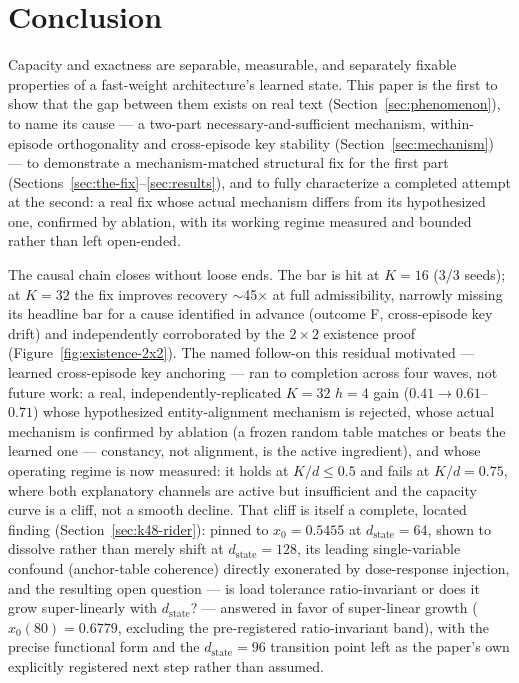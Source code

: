 \section{Conclusion}
\label{sec:conclusion}

Capacity and exactness are separable, measurable, and separately fixable
properties of a fast-weight architecture's learned state. This paper is
the first to show that the gap between them exists on real text
(Section~\ref{sec:phenomenon}), to name its cause --- a two-part
necessary-and-sufficient mechanism, within-episode orthogonality and
cross-episode key stability (Section~\ref{sec:mechanism}) --- to
demonstrate a mechanism-matched structural fix for the first part
(Sections~\ref{sec:the-fix}--\ref{sec:results}), and to fully
characterize a completed attempt at the second: a real fix whose actual
mechanism differs from its hypothesized one, confirmed by ablation, with
its working regime measured and bounded rather than left open-ended.

The causal chain closes without loose ends. The bar is hit at $K{=}16$
(3/3 seeds); at $K{=}32$ the fix improves recovery $\sim$45$\times$ at
full admissibility, narrowly missing its headline bar for a cause
identified in advance (outcome F, cross-episode key drift) and
independently corroborated by the $2\times2$ existence proof
(Figure~\ref{fig:existence-2x2}). The named follow-on this residual
motivated --- learned cross-episode key anchoring --- ran to completion
across four waves, not future work: a real, independently-replicated
$K{=}32$ $h{=}4$ gain ($0.41\to0.61$--$0.71$) whose hypothesized
entity-alignment mechanism is rejected, whose actual mechanism is
confirmed by ablation (a frozen random table matches or beats the
learned one --- constancy, not alignment, is the active ingredient), and
whose operating regime is now measured: it holds at $K/d\leq0.5$ and
fails at $K/d{=}0.75$, where both explanatory channels are active but
insufficient and the capacity curve is a cliff, not a smooth decline.
That cliff is itself a complete, located finding
(Section~\ref{sec:k48-rider}): pinned to $x_0{=}0.5455$ at
$d_{\mathrm{state}}{=}64$, shown to dissolve rather than merely shift at
$d_{\mathrm{state}}{=}128$, its leading single-variable confound
(anchor-table coherence) directly exonerated by dose-response injection,
and the resulting open question --- is load tolerance ratio-invariant or
does it grow super-linearly with $d_{\mathrm{state}}$? --- answered in
favor of super-linear growth ($x_0(80){=}0.6779$, excluding the
pre-registered ratio-invariant band), with the precise functional form
and the $d_{\mathrm{state}}{=}96$ transition point left as the paper's
own explicitly registered next step rather than assumed.

